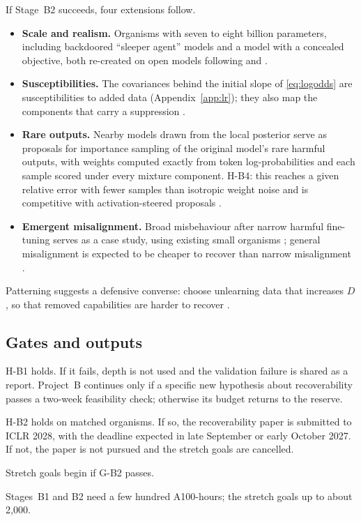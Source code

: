 \documentclass[11pt,a4paper]{article}
\begin{document}
If Stage~B2 succeeds, four extensions follow.
\begin{itemize}[leftmargin=*]
\item \textbf{Scale and realism.} Organisms with seven to eight billion
parameters, including backdoored ``sleeper agent'' models and a model with
a concealed objective, both re-created on open models following
\cite{hubinger2024} and \cite{marks2025}.
\item \textbf{Susceptibilities.} The covariances behind the initial slope
of \eqref{eq:logodds} are susceptibilities to added data
(Appendix~\ref{app:lr}); they also map the components that carry a
suppression \cite{baker2026}.
\item \textbf{Rare outputs.} Nearby models drawn from the local posterior
serve as proposals for importance sampling of the original model's rare
harmful outputs, with weights computed exactly from token log-probabilities
and each sample scored under every mixture component. H-B4: this reaches a
given relative error with fewer samples than isotropic weight noise and is
competitive with activation-steered proposals \cite{angell2026,wuhilton2025}.
\item \textbf{Emergent misalignment.} Broad misbehaviour after narrow
harmful fine-tuning \cite{betley2026} serves as a case study, using
existing small organisms \cite{turner2025}; general misalignment is
expected to be cheaper to recover than narrow misalignment
\cite{soligo2026,brown2026}.
\end{itemize}
Patterning suggests a defensive converse: choose unlearning data that
increases $D$, so that removed capabilities are harder to recover
\cite{wangmurfet2026}.

\subsection{Gates and outputs}

\begin{description}[style=nextline,leftmargin=1.5em]
\item[G-B1, month 6.] H-B1 holds. If it fails, depth is not used and the validation failure is shared as a report. Project~B continues only if a specific new hypothesis about recoverability passes a two-week feasibility check; otherwise its budget returns to the reserve.
\item[G-B2, month 9.] H-B2 holds on matched organisms. If so, the recoverability paper is submitted to ICLR 2028, with the deadline expected in late September or early October 2027. If not, the paper is not pursued and the stretch goals are cancelled.
\item[G-B3, month 10.] Stretch goals begin if G-B2 passes.
\end{description}
\noindent Stages~B1 and B2 need a few hundred A100-hours; the stretch goals
up to about 2,000.
\end{document}

